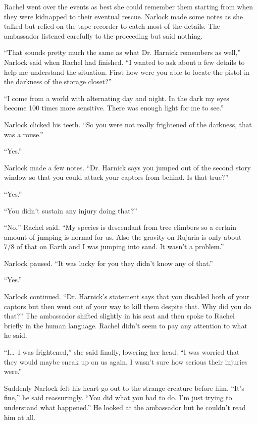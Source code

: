 Rachel went over the events as best she could remember them starting from when they were
kidnapped to their eventual rescue. Narlock made some notes as she talked but relied on the tape
recorder to catch most of the details. The ambassador listened carefully to the proceeding but
said nothing.

``That sounds pretty much the same as what Dr. Harnick remembers as well,'' Narlock said when
Rachel had finished. ``I wanted to ask about a few details to help me understand the situation.
First how were you able to locate the pistol in the darkness of the storage closet?''

``I come from a world with alternating day and night. In the dark my eyes become 100 times more
sensitive. There was enough light for me to see.''

Narlock clicked his teeth. ``So you were not really frightened of the darkness, that was a
rouse.''

``Yes.''

Narlock made a few notes. ``Dr. Harnick says you jumped out of the second story window so that
you could attack your captors from behind. Is that true?''

``Yes.''

``You didn't sustain any injury doing that?''

``No,'' Rachel said. ``My species is descendant from tree climbers so a certain amount of
jumping is normal for us. Also the gravity on Rujaria is only about 7/8 of that on Earth and I
was jumping into sand. It wasn't a problem.''

Narlock paused. ``It was lucky for you they didn't know any of that.''

``Yes.''

Narlock continued. ``Dr. Harnick's statement says that you disabled both of your captors but then
went out of your way to kill them despite that. Why did you do that?'' The ambassador shifted
slightly in his seat and then spoke to Rachel briefly in the human language. Rachel didn't seem
to pay any attention to what he said.

``I\ldots\ I was frightened,'' she said finally, lowering her head. ``I was worried that they
would maybe sneak up on us again. I wasn't sure how serious their injuries were.''

Suddenly Narlock felt his heart go out to the strange creature before him. ``It's fine,'' he said
reassuringly. ``You did what you had to do. I'm just trying to understand what happened.'' He
looked at the ambassador but he couldn't read him at all.

